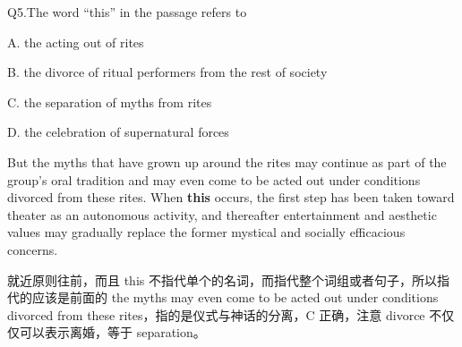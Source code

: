 \begin{blk}
    \begin{qst}
        Q5.The word “this” in the passage refers to
    \end{qst}

    \begin{chc}
        A. the acting out of rites

        B. the divorce of ritual performers from the rest of society

        C. the separation of myths from rites

        D. the celebration of supernatural forces
    \end{chc}

    \begin{psgq}
        But the myths that have grown up around the rites may continue as part of the group’s oral tradition and may even come to be acted out under conditions divorced from these rites. When \textbf{this} occurs, the first step has been taken toward theater as an autonomous activity, and thereafter entertainment and aesthetic values may gradually replace the former mystical and socially efficacious concerns.
    \end{psgq}

    \begin{nlz}
        就近原则往前，而且 this 不指代单个的名词，而指代整个词组或者句子，所以指代的应该是前面的 the myths may even come to be acted out under conditions divorced from these rites，指的是仪式与神话的分离，C 正确，注意 divorce 不仅仅可以表示离婚，等于 separation。
    \end{nlz}
\end{blk}

